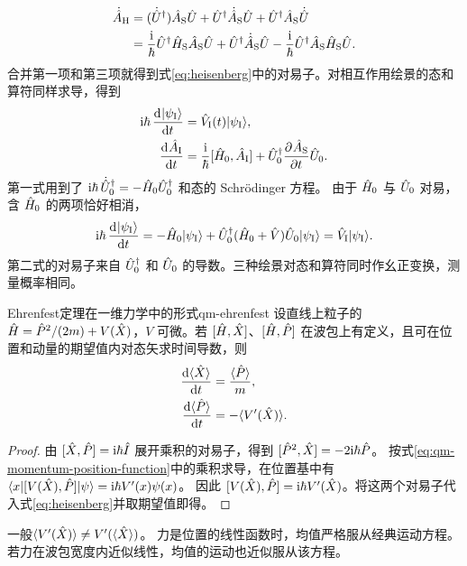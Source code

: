 \begin{alignat*}{1}
    \dot{\hat{A}}_{\mathrm{H}} &= (\dot{\hat{U}}^\dagger)\hat{A}_{\mathrm{S}}\hat{U} + \hat{U}^\dagger\dot{\hat{A}}_{\mathrm{S}}\hat{U}
        + \hat{U}^\dagger \hat{A}_{\mathrm{S}}\dot{\hat{U}}\\
    &= \frac{\mathrm{i}}{\hbar}\hat{U}^\dagger \hat{H}_{\mathrm{S}}\hat{A}_{\mathrm{S}}\hat{U}
        + \hat{U}^\dagger\dot{\hat{A}}_{\mathrm{S}}\hat{U}
        - \frac{\mathrm{i}}{\hbar}\hat{U}^\dagger \hat{A}_{\mathrm{S}}\hat{H}_{\mathrm{S}}\hat{U}.
\end{alignat*}
合并第一项和第三项就得到式\eqref{eq:heisenberg}中的对易子。对相互作用绘景的态和算符同样求导，得到
\begin{subequations}
    \begin{align}
        \mathrm{i}\hbar\,\frac{\mathop{}\!\mathrm{d}^{}\lvert\psi_{\mathrm{I}}\rangle}{\mathrm{d}{t}^{}}
        &= \hat{V}_{\mathrm{I}}(t)\lvert\psi_{\mathrm{I}}\rangle,\\
        \frac{\mathop{}\!\mathrm{d}^{}\hat{A}_{\mathrm{I}}}{\mathrm{d}{t}^{}}
        &= \frac{\mathrm{i}}{\hbar}[\hat{H}_0,\hat{A}_{\mathrm{I}}]
          + \hat{U}_0^\dagger\frac{\partial^{}\hat{A}_{\mathrm{S}}}{\partial{t}^{}}\hat{U}_0 .
    \end{align}
\end{subequations}
第一式用到了 $\mathrm{i}\hbar\,\dot{\hat{U}}_0^\dagger = -\hat{H}_0\hat{U}_0^\dagger$ 和态的 Schrödinger 方程。
由于 $\hat{H}_0$ 与 $\hat{U}_0$ 对易，含 $\hat{H}_0$ 的两项恰好相消，
\[
    \mathrm{i}\hbar\,\frac{\mathop{}\!\mathrm{d}^{}\lvert\psi_{\mathrm{I}}\rangle}{\mathrm{d}{t}^{}}
    = -\hat{H}_0\lvert\psi_{\mathrm{I}}\rangle
    + \hat{U}_0^\dagger(\hat{H}_0 + \hat{V})\hat{U}_0\lvert\psi_{\mathrm{I}}\rangle
    = \hat{V}_{\mathrm{I}}\lvert\psi_{\mathrm{I}}\rangle .
\]
第二式的对易子来自 $\hat{U}_0^\dagger$ 和 $\hat{U}_0$ 的导数。三种绘景对态和算符同时作幺正变换，测量概率相同。

\begin{theorem}[unbreakable]{Ehrenfest定理在一维力学中的形式}{qm-ehrenfest}
    设直线上粒子的 $\hat{H} = \hat{P}^2/(2m) + V(\hat{X})$，$V$ 可微。若 $[\hat{H},\hat{X}]$、$[\hat{H},\hat{P}]$ 在波包上有定义，且可在位置和动量的期望值内对态矢求时间导数，则
    \begin{subequations}
        \begin{align}
            \frac{\mathop{}\!\mathrm{d}\langle\hat{X}\rangle}{\mathrm{d} t} &= \frac{\langle\hat{P}\rangle}{m},\\
            \frac{\mathop{}\!\mathrm{d}\langle\hat{P}\rangle}{\mathrm{d} t} &= -\langle V'(\hat{X})\rangle.
        \end{align}
    \end{subequations}
\end{theorem}
\begin{proof}
    由 $[\hat{X},\hat{P}] = \mathrm{i}\hbar\hat{I}$ 展开乘积的对易子，得到 $[\hat{P}^2,\hat{X}] = -2\mathrm{i}\hbar\hat{P}$。
    按式\eqref{eq:qm-momentum-position-function}中的乘积求导，在位置基中有 $\langle x\vert[V(\hat{X}),\hat{P}]\vert\psi\rangle = \mathrm{i}\hbar V'(x)\psi(x)$。
    因此 $[V(\hat{X}),\hat{P}] = \mathrm{i}\hbar V'(\hat{X})$。将这两个对易子代入式\eqref{eq:heisenberg}并取期望值即得。
\end{proof}
一般$\langle V'(\hat{X})\rangle \ne V'(\langle\hat{X}\rangle)$。
力是位置的线性函数时，均值严格服从经典运动方程。若力在波包宽度内近似线性，均值的运动也近似服从该方程。


